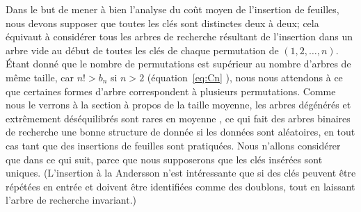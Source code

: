 Dans le but de mener à bien l'analyse du coût moyen de l'insertion de
feuilles, nous devons supposer que toutes les clés sont distinctes
deux à deux; cela équivaut à considérer tous les arbres de recherche
résultant de l'insertion dans un arbre vide au début de toutes les
clés de chaque permutation de \((1,2,\dots,n)\). Étant donné que le
nombre de permutations est supérieur au nombre d'arbres de même
taille, car \(n! > b_n\) si \(n > 2\) (équation~\eqref{eq:Cn}
), nous nous attendons à ce que certaines formes
d'arbre correspondent à plusieurs permutations. Comme nous le verrons
à la section à propos de la taille moyenne, les arbres dégénérés et
extrêmement déséquilibrés sont rares en moyenne \citep{Fill_1996}, ce
qui fait des arbres binaires de recherche une bonne structure de
donnée si les données sont aléatoires, en tout cas tant que des
insertions de feuilles sont pratiquées. Nous n'allons considérer que
 dans ce qui suit, parce que nous supposerons que les clés
insérées sont uniques. (L'insertion à la Andersson n'est intéressante
que si des clés peuvent être répétées en entrée et doivent être
identifiées comme des doublons, tout en laissant l'arbre de recherche
invariant.)

\bigskip

